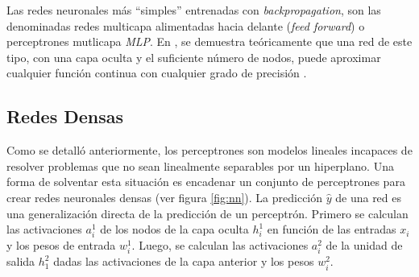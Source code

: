 Las redes neuronales más ``simples'' entrenadas con {\it backpropagation}, son las denominadas redes multicapa
alimentadas hacia delante ({\it feed forward}) o perceptrones mutlicapa {\it MLP}. En
\citeyear{funahashi1989approximate}, se demuestra teóricamente que una red de este tipo, con una capa oculta y el
suficiente número de nodos, puede aproximar cualquier función continua con cualquier grado de precisión \parencite{funahashi1989approximate}.

\subsection{Redes Densas}
Como se detalló anteriormente, los perceptrones son modelos lineales incapaces de resolver problemas que no sean
linealmente separables por un hiperplano. Una forma de solventar esta situación es encadenar un conjunto de
perceptrones para crear redes neuronales densas (ver figura \ref{fig:nn}). La predicción $\hat{y}$ de una red es una
generalización directa de la predicción de un perceptrón. Primero se calculan las activaciones $a_i^1$ de los nodos de
la capa oculta $h_i^1$ en función de las entradas $x_i$ y los pesos de entrada $w_i^1$. Luego, se calculan las
activaciones $a_i^2$ de la unidad de salida $h_1^2$ dadas las activaciones de la capa anterior y los pesos $w_i^2$.

